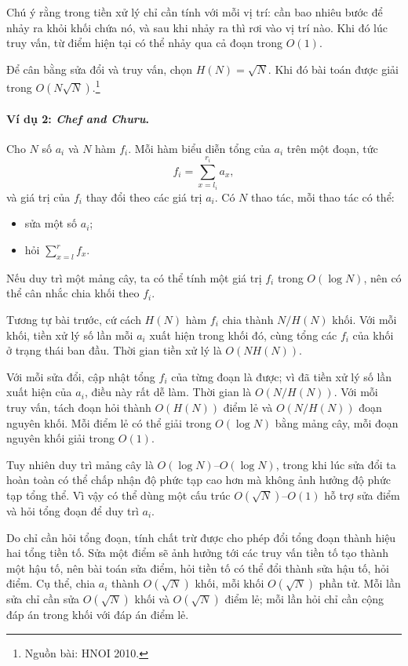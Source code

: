 \documentclass[11pt]{article}
\begin{document}
Chú ý rằng trong tiền xử lý chỉ cần tính với mỗi vị trí: cần bao nhiêu bước để
nhảy ra khỏi khối chứa nó, và sau khi nhảy ra thì rơi vào vị trí nào. Khi đó lúc
truy vấn, từ điểm hiện tại có thể nhảy qua cả đoạn trong \(O(1)\).

Để cân bằng sửa đổi và truy vấn, chọn \(H(N)=\sqrt N\). Khi đó bài toán được
giải trong \(O(N\sqrt N)\).\footnote{Nguồn bài: HNOI 2010.}

\paragraph{Ví dụ 2: \emph{Chef and Churu}.}
Cho \(N\) số \(a_i\) và \(N\) hàm \(f_i\). Mỗi hàm biểu diễn tổng của \(a_i\)
trên một đoạn, tức
\[
  f_i=\sum_{x=l_i}^{r_i}a_x,
\]
và giá trị của \(f_i\) thay đổi theo các giá trị \(a_i\). Có \(N\) thao tác, mỗi
thao tác có thể:
\begin{itemize}
  \item sửa một số \(a_i\);
  \item hỏi \(\sum_{x=l}^{r} f_x\).
\end{itemize}

Nếu duy trì một mảng cây, ta có thể tính một giá trị \(f_i\) trong
\(O(\log N)\), nên có thể cân nhắc chia khối theo \(f_i\).

Tương tự bài trước, cứ cách \(H(N)\) hàm \(f_i\) chia thành \(N/H(N)\) khối. Với
mỗi khối, tiền xử lý số lần mỗi \(a_i\) xuất hiện trong khối đó, cùng tổng các
\(f_i\) của khối ở trạng thái ban đầu. Thời gian tiền xử lý là \(O(NH(N))\).

Với mỗi sửa đổi, cập nhật tổng \(f_i\) của từng đoạn là được; vì đã tiền xử lý
số lần xuất hiện của \(a_i\), điều này rất dễ làm. Thời gian là \(O(N/H(N))\).
Với mỗi truy vấn, tách đoạn hỏi thành \(O(H(N))\) điểm lẻ và \(O(N/H(N))\)
đoạn nguyên khối. Mỗi điểm lẻ có thể giải trong \(O(\log N)\) bằng mảng cây,
mỗi đoạn nguyên khối giải trong \(O(1)\).

Tuy nhiên duy trì mảng cây là \(O(\log N)\)--\(O(\log N)\), trong khi lúc sửa
đổi ta hoàn toàn có thể chấp nhận độ phức tạp cao hơn mà không ảnh hưởng độ
phức tạp tổng thể. Vì vậy có thể dùng một cấu trúc \(O(\sqrt N)\)--\(O(1)\) hỗ
trợ sửa điểm và hỏi tổng đoạn để duy trì \(a_i\).

Do chỉ cần hỏi tổng đoạn, tính chất trừ được cho phép đổi tổng đoạn thành hiệu
hai tổng tiền tố. Sửa một điểm sẽ ảnh hưởng tới các truy vấn tiền tố tạo thành
một hậu tố, nên bài toán sửa điểm, hỏi tiền tố có thể đổi thành sửa hậu tố, hỏi
điểm. Cụ thể, chia \(a_i\) thành \(O(\sqrt N)\) khối, mỗi khối \(O(\sqrt N)\)
phần tử. Mỗi lần sửa chỉ cần sửa \(O(\sqrt N)\) khối và \(O(\sqrt N)\) điểm lẻ;
mỗi lần hỏi chỉ cần cộng đáp án trong khối với đáp án điểm lẻ.
\end{document}
